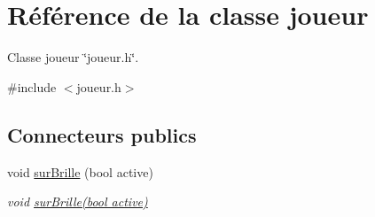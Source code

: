 \hypertarget{classjoueur}{\section{Référence de la classe joueur}
\label{classjoueur}
}


Classe joueur \char`\"{}joueur.\-h\char`\"{}.  




{\ttfamily \#include $<$joueur.\-h$>$}

\subsection*{Connecteurs publics}
\begin{DoxyCompactItemize}
\item 
void \hyperlink{classjoueur_a6c718c04f1db54452e366aeaddeb249d}{sur\-Brille} (bool active)
\begin{DoxyCompactList}\small\item\em void \hyperlink{classjoueur_a6c718c04f1db54452e366aeaddeb249d}{sur\-Brille(bool active)} \end{DoxyCompactList}\end{DoxyCompactItemize}
